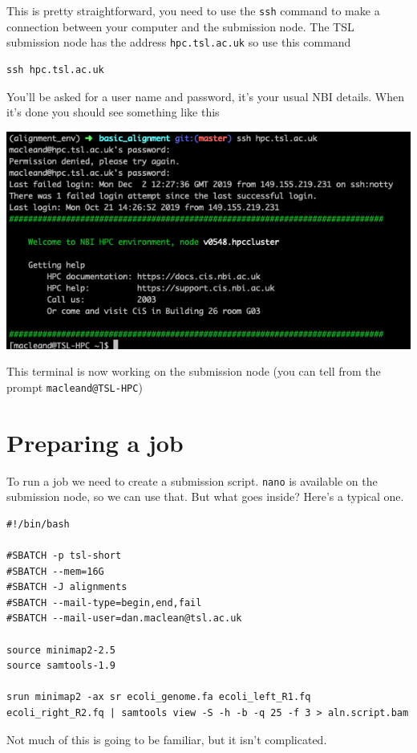 \documentclass[]{book}
\begin{document}
This is pretty straightforward, you need to use the \texttt{ssh} command to make a connection between your computer and the submission node. The TSL submission node has the address \texttt{hpc.tsl.ac.uk} so use this command

\begin{verbatim}
ssh hpc.tsl.ac.uk
\end{verbatim}

You'll be asked for a user name and password, it's your usual NBI details. When it's done you should see something like this

\includegraphics{login.png}

This terminal is now working on the submission node (you can tell from the prompt \texttt{macleand@TSL-HPC})

\hypertarget{preparing-a-job}{%
\section{Preparing a job}\label{preparing-a-job}}

To run a job we need to create a submission script. \texttt{nano} is available on the submission node, so we can use that. But what goes inside? Here's a typical one.

\begin{verbatim}
#!/bin/bash

#SBATCH -p tsl-short
#SBATCH --mem=16G
#SBATCH -J alignments
#SBATCH --mail-type=begin,end,fail
#SBATCH --mail-user=dan.maclean@tsl.ac.uk

source minimap2-2.5
source samtools-1.9

srun minimap2 -ax sr ecoli_genome.fa ecoli_left_R1.fq ecoli_right_R2.fq | samtools view -S -h -b -q 25 -f 3 > aln.script.bam
\end{verbatim}

Not much of this is going to be familiar, but it isn't complicated.
\end{document}
